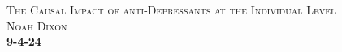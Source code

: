 \documentclass[12pt,letterpaper,doublespace, oneside]{article}
\begin{document}
\begin{titlepage}
    \centering
    \vspace*{\fill}

    \textsc{\Huge The Causal Impact of anti-Depressants at the Individual Level}\\[2em]

	\textsc{\Large Noah Dixon}\\[2em]
	

	\textbf{\textsc{\LARGE {\color{darkred}9-4-24} }}
	
	\vspace*{\fill}

\end{titlepage}

\newpage
\UseRawInputEncoding

\newcommand{\capitalizeTitle}[1]{%
    \StrSubstitute{#1}{ }{~}[\title]%
    \expandafter\capitalizetitle\expandafter{\title}%
}

\newcommand{\capitalizetitle}[1]{%
    \expandafter\StrSubstitute\expandafter{#1}{~}{ }[\Title]%
    \expandafter\StrSubstitute\expandafter{\Title}{ a }{ A }[\Title]%
    \expandafter\StrSubstitute\expandafter{\Title}{ an }{ An }[\Title]%
    \expandafter\StrSubstitute\expandafter{\Title}{ and }{ And }[\Title]%
    \expandafter\StrSubstitute\expandafter{\Title}{ as }{ As }[\Title]%
    \expandafter\StrSubstitute\expandafter{\Title}{ at }{ At }[\Title]%
    \expandafter\StrSubstitute\expandafter{\Title}{ but }{ But }[\Title]%
    \expandafter\StrSubstitute\expandafter{\Title}{ by }{ By }[\Title]%
    \expandafter\StrSubstitute\expandafter{\Title}{ for }{ For }[\Title]%
    \expandafter\StrSubstitute\expandafter{\Title}{ from }{ From }[\Title]%
    \expandafter\StrSubstitute\expandafter{\Title}{ in }{ In }[\Title]%
    \expandafter\StrSubstitute\expandafter{\Title}{ into }{ Into }[\Title]%
    \expandafter\StrSubstitute\expandafter{\Title}{ near }{ Near }[\Title]%
    \expandafter\StrSubstitute\expandafter{\Title}{ of }{ Of }[\Title]%
    \expandafter\StrSubstitute\expandafter{\Title}{ on }{ On }[\Title]%
    \expandafter\StrSubstitute\expandafter{\Title}{ onto }{ Onto }[\Title]%
    \expandafter\StrSubstitute\expandafter{\Title}{ or }{ Or }[\Title]%
    \expandafter\StrSubstitute\expandafter{\Title}{ the }{ The }[\Title]%
    \expandafter\StrSubstitute\expandafter{\Title}{ to }{ To }[\Title]%
    \expandafter\StrSubstitute\expandafter{\Title}{ under }{ Under }[\Title]%
    \expandafter\StrSubstitute\expandafter{\Title}{ upon }{ Upon }[\Title]%
    \expandafter\StrSubstitute\expandafter{\Title}{ with }{ With }[\Title]%
    \expandafter\StrSubstitute\expandafter{\Title}{ within }{ Within }[\Title]%
    \expandafter\StrSubstitute\expandafter{\Title}{ without }{ Without }[\Title]%
    \expandafter\StrSubstitute\expandafter{\Title}{ and }{ And }[\Title]%
    \expandafter\MakeUppercase\expandafter{\Title}%
}
\end{document}
